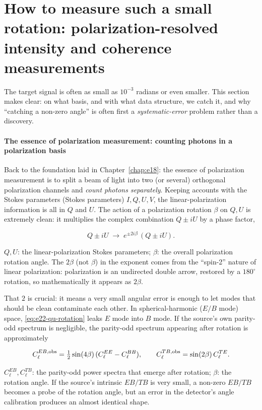 \section{How to measure such a small rotation: polarization-resolved intensity and coherence measurements}
\label{sec:e22-measure}

The target signal is often as small as \(10^{-3}\) radians or even smaller. This section makes clear: on what basis, and with what data structure, we catch it, and why ``catching a non-zero angle'' is often first a \emph{systematic-error} problem rather than a discovery.

\paragraph{The essence of polarization measurement: counting photons in a polarization basis}

Back to the foundation laid in Chapter~\ref{chap:e18}: the essence of polarization measurement is to split a beam of light into two (or several) orthogonal polarization channels and \emph{count photons separately}. Keeping accounts with the Stokes parameters (Stokes parameters) \(I,Q,U,V\), the linear-polarization information is all in \(Q\) and \(U\). The action of a polarization rotation \(\beta\) on \(Q,U\) is extremely clean: it multiplies the complex combination \(Q\pm iU\) by a phase factor,

\begin{equation}
  Q\pm iU \;\longrightarrow\; e^{\pm 2i\beta}\,(Q\pm iU).
  \label{eq:e22-qu-rotation}
\end{equation}
\begin{formulaexplain}
\(Q,U\): the linear-polarization Stokes parameters; \(\beta\): the overall polarization rotation angle. The \(2\beta\) (not \(\beta\)) in the exponent comes from the ``spin-2'' nature of linear polarization: polarization is an undirected double arrow, restored by a \(180^\circ\) rotation, so mathematically it appears as \(2\beta\).
\end{formulaexplain}

That \(2\) is crucial: it means a very small angular error is enough to let modes that should be clean contaminate each other. In spherical-harmonic (\(E/B\) mode) space, \eqref{eq:e22-qu-rotation} leaks \(E\) mode into \(B\) mode. If the source's own parity-odd spectrum is negligible, the parity-odd spectrum appearing after rotation is approximately

\begin{equation}
  C_\ell^{EB,\rm obs}=\tfrac12\sin(4\beta)\,(C_\ell^{EE}-C_\ell^{BB}),
  \qquad
  C_\ell^{TB,\rm obs}=\sin(2\beta)\,C_\ell^{TE}.
  \label{eq:e22-eb-tb}
\end{equation}
\begin{formulaexplain}
\(C_\ell^{EB},C_\ell^{TB}\): the parity-odd power spectra that emerge after rotation; \(\beta\): the rotation angle. If the source's intrinsic \(EB/TB\) is very small, a non-zero \(EB/TB\) becomes a probe of the rotation angle, but an error in the detector's angle calibration produces an almost identical shape.
\end{formulaexplain}

